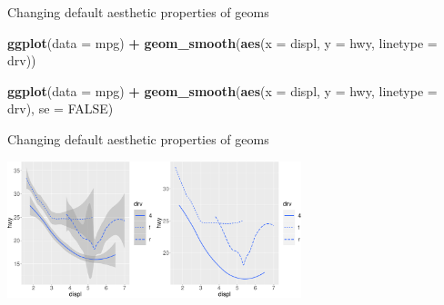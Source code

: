 \documentclass[ignorenonframetext,]{beamer}
\newenvironment{Shaded}{\begin{snugshade}}{\end{snugshade}}
\newcommand{\DataTypeTok}[1]{\textcolor[rgb]{0.13,0.29,0.53}{#1}}
\newcommand{\KeywordTok}[1]{\textcolor[rgb]{0.13,0.29,0.53}{\textbf{#1}}}
\newcommand{\NormalTok}[1]{#1}
\newcommand{\OperatorTok}[1]{\textcolor[rgb]{0.81,0.36,0.00}{\textbf{#1}}}
\newcommand{\OtherTok}[1]{\textcolor[rgb]{0.56,0.35,0.01}{#1}}
\newcommand{\StringTok}[1]{\textcolor[rgb]{0.31,0.60,0.02}{#1}}
\begin{document}
\begin{frame}[fragile]{Changing default aesthetic properties of geoms}
\protect\hypertarget{changing-default-aesthetic-properties-of-geoms-27}{}

\begin{Shaded}
\begin{Highlighting}[]
\KeywordTok{ggplot}\NormalTok{(}\DataTypeTok{data =}\NormalTok{ mpg) }\OperatorTok{+}
\StringTok{  }\KeywordTok{geom_smooth}\NormalTok{(}\KeywordTok{aes}\NormalTok{(}\DataTypeTok{x =}\NormalTok{ displ, }\DataTypeTok{y =}\NormalTok{ hwy, }\DataTypeTok{linetype =}\NormalTok{ drv))}

\KeywordTok{ggplot}\NormalTok{(}\DataTypeTok{data =}\NormalTok{ mpg) }\OperatorTok{+}
\StringTok{  }\KeywordTok{geom_smooth}\NormalTok{(}\KeywordTok{aes}\NormalTok{(}\DataTypeTok{x =}\NormalTok{ displ, }\DataTypeTok{y =}\NormalTok{ hwy, }\DataTypeTok{linetype =}\NormalTok{ drv),}
    \DataTypeTok{se =} \OtherTok{FALSE}\NormalTok{)}
\end{Highlighting}
\end{Shaded}

\end{frame}

\begin{frame}{Changing default aesthetic properties of geoms}
\protect\hypertarget{changing-default-aesthetic-properties-of-geoms-28}{}

\begin{center}\includegraphics[height=150px]{data-visualization_files/figure-beamer/unnamed-chunk-61-1} \end{center}

\end{frame}
\end{document}
